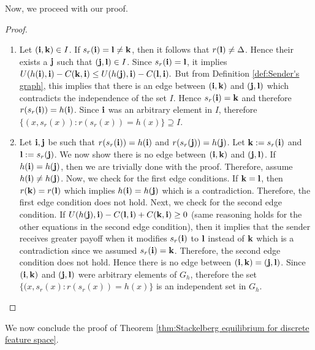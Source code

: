 Now, we proceed with our proof.
\begin{proof}
	\begin{enumerate}[label=(\alph*)]
		\item Let $(\mathbf{i},\mathbf{k}) \in I$. If $s_r(\mathbf{i}) = \mathbf{l} \neq \mathbf{k}$, then it follows that $r(\mathbf{l}) \neq \Delta$. Hence their exists a $\mathbf{j}$ such that $(\mathbf{j},\mathbf{l}) \in I$. Since $s_r(\mathbf{i}) = \mathbf{l}$, it implies $U(h(\mathbf{i}),\mathbf{i}) - C(\mathbf{k},\mathbf{i}) \leq U(h(\mathbf{j}),\mathbf{i}) - C(\mathbf{l},\mathbf{i}).$ But from Definition \ref{def:Sender's graph}, this implies that there is an edge between $(\mathbf{i},\mathbf{k})$ and $(\mathbf{j},\mathbf{l})$ which contradicts the independence of the set $I$. Hence $s_r(\mathbf{i}) = \mathbf{k}$ and therefore $r(s_r(\mathbf{i})) = h(\mathbf{i})$. Since $\mathbf{i}$ was an arbitrary element in $I$, therefore $\{(x,s_r(x)): r(s_r(x)) = h(x)\} \supseteq I$.
		
		\item Let $\mathbf{i}, \mathbf{j}$ be such that $r(s_r(\mathbf{i})) = h(\mathbf{i})$ and $r(s_r(\mathbf{j})) = h(\mathbf{j})$. Let $\mathbf{k} := s_r(\mathbf{i})$ and $\mathbf{l} := s_r(\mathbf{j})$. We now show there is no edge between $(\mathbf{i},\mathbf{k})$ and $(\mathbf{j},\mathbf{l})$. If $h(\mathbf{i}) = h(\mathbf{j})$, then we are trivially done with the proof. Therefore, assume $h(\mathbf{i}) \neq h(\mathbf{j})$. Now, we check for the first edge conditions. If $\mathbf{k} = \mathbf{l}$, then $r(\mathbf{k}) = r(\mathbf{l})$ which implies $h(\mathbf{i}) = h(\mathbf{j})$ which is a contradiction. Therefore, the first edge condition does not hold. Next, we check for the second edge condition. If $U(h(\mathbf{j}),\mathbf{i}) - C(\mathbf{l},\mathbf{i}) + C(\mathbf{k},\mathbf{i}) \geq 0$ (same reasoning holds for the other equations in the second edge condition), then it implies that the sender receives greater payoff when it modifies $s_r(\mathbf{i})$ to $\mathbf{l}$ instead of $\mathbf{k}$ which is a contradiction since we assumed $s_r(\mathbf{i}) = \mathbf{k}$. Therefore, the second edge condition does not hold.
		Hence there is no edge between $(\mathbf{i},\mathbf{k}) =(\mathbf{j},\mathbf{l})$. Since $(\mathbf{i},\mathbf{k})$ and $(\mathbf{j},\mathbf{l})$ were arbitrary elements of $G_h$, therefore the set $\{(x,s_r(x):r(s_r(x)) = h(x)\}$ is an independent set in $G_h$.
		
	\end{enumerate}
\end{proof}
We now conclude the proof of Theorem \ref{thm:Stackelberg equilibrium for discrete feature space}.

